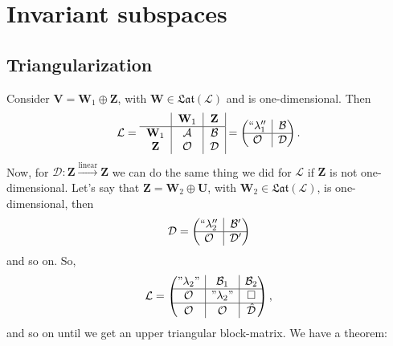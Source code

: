 \documentclass{book}
\theoremstyle{definition}
\newcommand{\V}{\mathbf{V}}
\newcommand{\W}{\mathbf{W}}
\newcommand{\Z}{\mathbf{Z}}
\newcommand{\U}{\mathbf{U}}
\newcommand{\lag}{\mathcal{L}}
\newcommand{\lin}{\overset{\text{linear}}{\longrightarrow}}
\newcommand{\rvline}{\hspace*{-\arraycolsep}\vline\hspace*{-\arraycolsep}}
\begin{document}
\newpage
\chapter{Invariant subspaces}

\section{Triangularization}

Consider $\V = \W_1 \oplus \Z$, with $\W \in \mathfrak{Lat}(\lag)$ and is one-dimensional. Then
\begin{align*}
\lag = \begin{tabular}{c|c|c|}
& $\W_1$ & $\Z$\\
\hline
$\W_1$& $\mathcal{A}$ & $\mathcal{B}$ \\	
$\Z$& $\mathcal{O}$  & $\mathcal{D}$ 
\end{tabular}=
\begin{pmatrix}
``\lambda_1'' & \rvline & \mathcal{B}\\
\hline
\mathcal{O} & \rvline & \mathcal{D}
\end{pmatrix}.
\end{align*}
Now, for $\mathcal{D} : \Z \lin \Z$ we can do the same thing we did for $\lag$ if $\Z$ is not one-dimensional. Let's say that $\Z = \W_2 \oplus \U$, with $\W_2 \in \mathfrak{Lat}(\lag)$, is one-dimensional, then
\begin{align*}
\mathcal{D} = \begin{pmatrix}
``\lambda_2'' & \rvline & \mathcal{B'}\\
\hline
\mathcal{O} & \rvline & \mathcal{D'}
\end{pmatrix}
\end{align*}
and so on. So, 
\begin{align*}
\lag = \begin{pmatrix}
"\lambda_2" & \rvline & \mathcal{B}_1 & \rvline & \mathcal{B}_2\\
\hline
\mathcal{O} & \rvline & "\lambda_2" & \rvline &\square\\
\hline
\mathcal{O} & \rvline & \mathcal{O}& \rvline &\hat{\mathcal{D}}\\
\end{pmatrix},
\end{align*}
and so on until we get an upper triangular block-matrix. We have a theorem:
\end{document}
